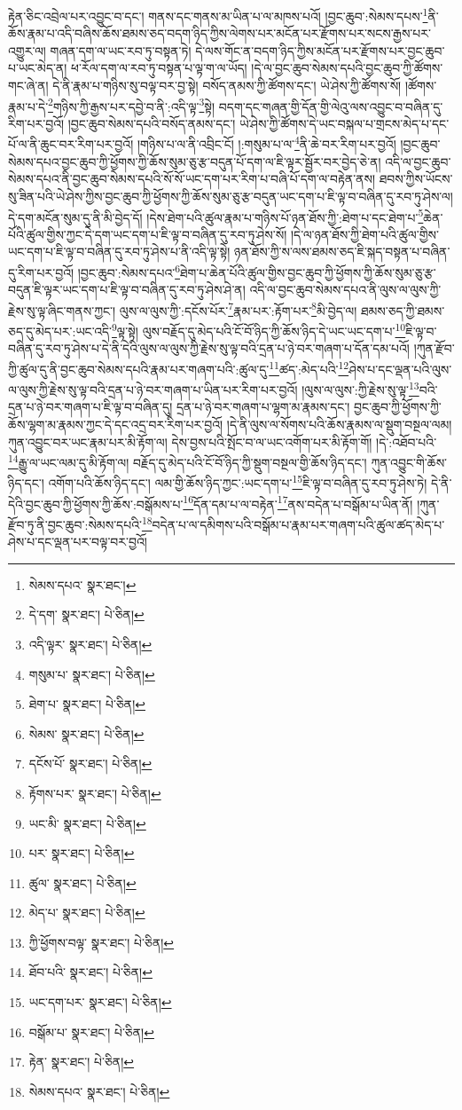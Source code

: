 རྟེན་ཅིང་འབྲེལ་པར་འབྱུང་བ་དང་། གནས་དང་གནས་མ་ཡིན་པ་ལ་མཁས་པའོ། །བྱང་ཆུབ་:སེམས་དཔས་\footnote{སེམས་དཔའ་  སྣར་ཐང་། }ནི་ཆོས་རྣམ་པ་འདི་བཞིས་ཆོས་ཐམས་ཅད་བདག་ཉིད་ཀྱིས་ལེགས་པར་མངོན་པར་རྫོགས་པར་སངས་རྒྱས་པར་འགྱུར་ལ། གཞན་དག་ལ་ཡང་རབ་ཏུ་བསྟན་ཏེ། དེ་ལས་གོང་ན་བདག་ཉིད་ཀྱིས་མངོན་པར་རྫོགས་པར་བྱང་ཆུབ་པ་ཡང་མེད་ན། ཕ་རོལ་དག་ལ་རབ་ཏུ་བསྟན་པ་ལྟ་ག་ལ་ཡོད། །དེ་ལ་བྱང་ཆུབ་སེམས་དཔའི་བྱང་ཆུབ་ཀྱི་ཚོགས་གང་ཞེ་ན། དེ་ནི་རྣམ་པ་གཉིས་སུ་བལྟ་བར་བྱ་སྟེ། བསོད་ནམས་ཀྱི་ཚོགས་དང་། ཡེ་ཤེས་ཀྱི་ཚོགས་སོ། །ཚོགས་རྣམ་པ་དེ་\footnote{དེ་དག་  སྣར་ཐང་།  པེ་ཅིན། }གཉིས་ཀྱི་རྒྱས་པར་དབྱེ་བ་ནི་:འདི་ལྟ་\footnote{འདི་ལྟར་  སྣར་ཐང་།  པེ་ཅིན། }སྟེ། བདག་དང་གཞན་གྱི་དོན་གྱི་ལེའུ་ལས་འབྱུང་བ་བཞིན་དུ་རིག་པར་བྱའོ། །བྱང་ཆུབ་སེམས་དཔའི་བསོད་ནམས་དང་། ཡེ་ཤེས་ཀྱི་ཚོགས་དེ་ཡང་བསྐལ་པ་གྲངས་མེད་པ་དང་པོ་ལ་ནི་ཆུང་བར་རིག་པར་བྱའོ། །གཉིས་པ་ལ་ནི་འབྲིང་ངོ། །:གསུམ་པ་ལ་\footnote{གསུམ་པ་  སྣར་ཐང་།  པེ་ཅིན། }ནི་ཆེ་བར་རིག་པར་བྱའོ། །བྱང་ཆུབ་སེམས་དཔའ་བྱང་ཆུབ་ཀྱི་ཕྱོགས་ཀྱི་ཆོས་སུམ་ཅུ་རྩ་བདུན་པོ་དག་ལ་ཇི་ལྟར་སྦྱོར་བར་བྱེད་ཅེ་ན། འདི་ལ་བྱང་ཆུབ་སེམས་དཔའ་ནི་བྱང་ཆུབ་སེམས་དཔའི་སོ་སོ་ཡང་དག་པར་རིག་པ་བཞི་པོ་དག་ལ་བརྟེན་ནས། ཐབས་ཀྱིས་ཡོངས་སུ་ཟིན་པའི་ཡེ་ཤེས་ཀྱིས་བྱང་ཆུབ་ཀྱི་ཕྱོགས་ཀྱི་ཆོས་སུམ་ཅུ་རྩ་བདུན་ཡང་དག་པ་ཇི་ལྟ་བ་བཞིན་དུ་རབ་ཏུ་ཤེས་ལ། དེ་དག་མངོན་སུམ་དུ་ནི་མི་བྱེད་དོ། །དེས་ཐེག་པའི་ཚུལ་རྣམ་པ་གཉིས་པོ་ཉན་ཐོས་ཀྱི་:ཐེག་པ་དང་ཐེག་པ་\footnote{ཐེག་པ་  སྣར་ཐང་།  པེ་ཅིན། }ཆེན་པོའི་ཚུལ་གྱིས་ཀྱང་དེ་དག་ཡང་དག་པ་ཇི་ལྟ་བ་བཞིན་དུ་རབ་ཏུ་ཤེས་སོ། །དེ་ལ་ཉན་ཐོས་ཀྱི་ཐེག་པའི་ཚུལ་གྱིས་ཡང་དག་པ་ཇི་ལྟ་བ་བཞིན་དུ་རབ་ཏུ་ཤེས་པ་ནི་འདི་ལྟ་སྟེ། ཉན་ཐོས་ཀྱི་ས་ལས་ཐམས་ཅད་ཇི་སྐད་བསྟན་པ་བཞིན་དུ་རིག་པར་བྱའོ། །བྱང་ཆུབ་:སེམས་དཔའ་\footnote{སེམས་  སྣར་ཐང་།  པེ་ཅིན། }ཐེག་པ་ཆེན་པོའི་ཚུལ་གྱིས་བྱང་ཆུབ་ཀྱི་ཕྱོགས་ཀྱི་ཆོས་སུམ་ཅུ་རྩ་བདུན་ཇི་ལྟར་ཡང་དག་པ་ཇི་ལྟ་བ་བཞིན་དུ་རབ་ཏུ་ཤེས་ཤེ་ན། འདི་ལ་བྱང་ཆུབ་སེམས་དཔའ་ནི་ལུས་ལ་ལུས་ཀྱི་རྗེས་སུ་ལྟ་ཞིང་གནས་ཀྱང་། ལུས་ལ་ལུས་ཀྱི་:དངོས་པོར་\footnote{དངོས་པོ་  སྣར་ཐང་།  པེ་ཅིན། }རྣམ་པར་:རྟོག་པར་\footnote{རྟོགས་པར་  སྣར་ཐང་།  པེ་ཅིན། }མི་བྱེད་ལ། ཐམས་ཅད་ཀྱི་ཐམས་ཅད་དུ་མེད་པར་:ཡང་འདི་\footnote{ཡང་མི་  སྣར་ཐང་།  པེ་ཅིན། }ལྟ་སྟེ། ལུས་བརྗོད་དུ་མེད་པའི་ངོ་བོ་ཉིད་ཀྱི་ཆོས་ཉིད་དེ་ཡང་ཡང་དག་པ་\footnote{པར་  སྣར་ཐང་།  པེ་ཅིན། }ཇི་ལྟ་བ་བཞིན་དུ་རབ་ཏུ་ཤེས་པ་དེ་ནི་དེའི་ལུས་ལ་ལུས་ཀྱི་རྗེས་སུ་ལྟ་བའི་དྲན་པ་ཉེ་བར་གཞག་པ་དོན་དམ་པའོ། །ཀུན་རྫོབ་ཀྱི་ཚུལ་དུ་ནི་བྱང་ཆུབ་སེམས་དཔའི་རྣམ་པར་གཞག་པའི་:ཚུལ་དུ་\footnote{ཚུལ་  སྣར་ཐང་།  པེ་ཅིན། }ཚད་:མེད་པའི་\footnote{མེད་པ་  སྣར་ཐང་།  པེ་ཅིན། }ཤེས་པ་དང་ལྡན་པའི་ལུས་ལ་ལུས་ཀྱི་རྗེས་སུ་ལྟ་བའི་དྲན་པ་ཉེ་བར་གཞག་པ་ཡིན་པར་རིག་པར་བྱའོ། །ལུས་ལ་ལུས་:ཀྱི་རྗེས་སུ་ལྟ་\footnote{ཀྱི་ཕྱོགས་བལྟ་  སྣར་ཐང་།  པེ་ཅིན། }བའི་དྲན་པ་ཉེ་བར་གཞག་པ་ཇི་ལྟ་བ་བཞིན་དུ། དྲན་པ་ཉེ་བར་གཞག་པ་ལྷག་མ་རྣམས་དང་། བྱང་ཆུབ་ཀྱི་ཕྱོགས་ཀྱི་ཆོས་ལྷག་མ་རྣམས་ཀྱང་དེ་དང་འདྲ་བར་རིག་པར་བྱའོ། །དེ་ནི་ལུས་ལ་སོགས་པའི་ཆོས་རྣམས་ལ་སྡུག་བསྔལ་ལམ། ཀུན་འབྱུང་བར་ཡང་རྣམ་པར་མི་རྟོག་ལ། དེས་བྱས་པའི་སྤོང་བ་ལ་ཡང་འགོག་པར་མི་རྟོག་གོ། །དེ་:འཐོབ་པའི་\footnote{ཐོབ་པའི་  སྣར་ཐང་།  པེ་ཅིན། }རྒྱུ་ལ་ཡང་ལམ་དུ་མི་རྟོག་ལ། བརྗོད་དུ་མེད་པའི་ངོ་བོ་ཉིད་ཀྱི་སྡུག་བསྔལ་གྱི་ཆོས་ཉིད་དང་། ཀུན་འབྱུང་གི་ཆོས་ཉིད་དང་། འགོག་པའི་ཆོས་ཉིད་དང་། ལམ་གྱི་ཆོས་ཉིད་ཀྱང་:ཡང་དག་པ་\footnote{ཡང་དག་པར་  སྣར་ཐང་།  པེ་ཅིན། }ཇི་ལྟ་བ་བཞིན་དུ་རབ་ཏུ་ཤེས་ཏེ། དེ་ནི་དེའི་བྱང་ཆུབ་ཀྱི་ཕྱོགས་ཀྱི་ཆོས་:བསྒོམས་པ་\footnote{བསྒོམ་པ་  སྣར་ཐང་།  པེ་ཅིན། }དོན་དམ་པ་ལ་བརྟེན་\footnote{རྟེན་  སྣར་ཐང་།  པེ་ཅིན། }ནས་བདེན་པ་བསྒོམ་པ་ཡིན་ནོ། །ཀུན་རྫོབ་ཏུ་ནི་བྱང་ཆུབ་:སེམས་དཔའི་\footnote{སེམས་དཔའ་  སྣར་ཐང་།  པེ་ཅིན། }བདེན་པ་ལ་དམིགས་པའི་བསྒོམ་པ་རྣམ་པར་གཞག་པའི་ཚུལ་ཚད་མེད་པ་ཤེས་པ་དང་ལྡན་པར་བལྟ་བར་བྱའོ། 